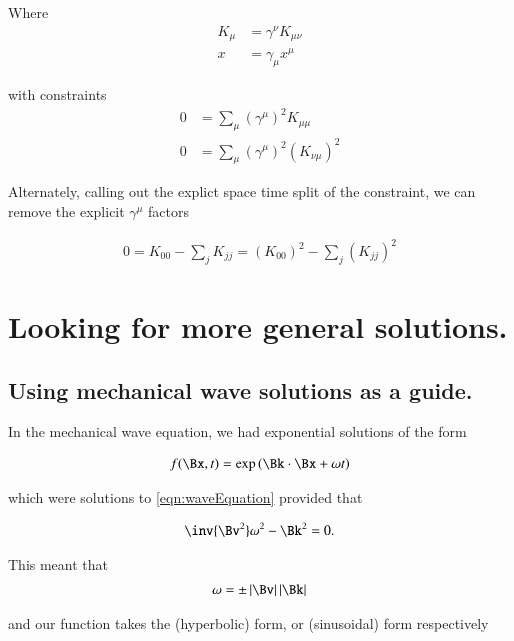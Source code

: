 \documentclass{article}
\begin{document}
Where
\begin{align*}
K_\mu &= \gamma^\nu K_{\mu\nu} \\
x &= \gamma_\mu x^\mu
\end{align*}

with constraints
\begin{align*}
0 &= \sum_\mu (\gamma^\mu)^2 K_{\mu\mu} \\
0 &= \sum_\mu (\gamma^\mu)^2 (K_{\nu\mu})^2
\end{align*}

Alternately, calling out the explict space time split of the constraint, we can
remove the explicit $\gamma^\mu$ factors 

\begin{align*}
0 = K_{00} - \sum_j K_{jj} = (K_{00})^2 - \sum_j (K_{jj} )^2
\end{align*}

%
%

\section{ Looking for more general solutions. }

\subsection{ Using mechanical wave solutions as a guide. }

In the mechanical wave equation, we had exponential solutions of the form

\begin{align*}
f(\Bx,t) = \exp\left( \Bk \cdot \Bx + \omega t \right)
\end{align*}

which were solutions to \ref{eqn:waveEquation} provided that

\begin{align*}
\inv{\Bv^2} \omega^2 - \Bk^2 = 0.
\end{align*}

This meant that 
\begin{align*}
\omega = \pm \Abs{\Bv} \Abs{\Bk}
\end{align*}

and our function takes the (hyperbolic) form, or (sinusoidal) form respectively
\end{document}
